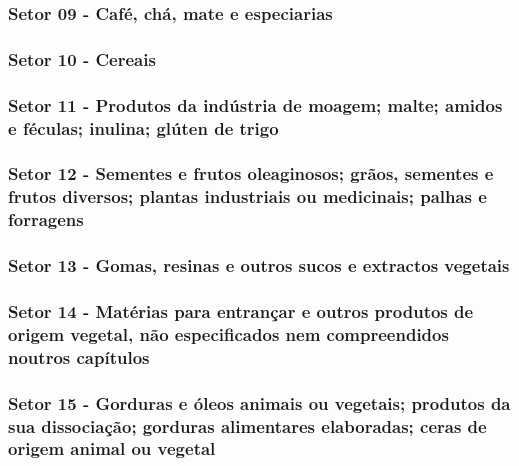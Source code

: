  
\subsubsection{Setor 09 - Café, chá, mate e especiarias}

 

\newpage

\subsubsection{Setor 10 - Cereais}



\newpage

\subsubsection{Setor 11 - Produtos da indústria de moagem; malte; amidos e féculas; inulina; glúten de trigo}



\newpage

\subsubsection{Setor 12 - Sementes e frutos oleaginosos; grãos, sementes e frutos diversos; plantas industriais ou medicinais; palhas e forragens}



\newpage

\subsubsection{Setor 13 - Gomas, resinas e outros sucos e extractos vegetais}



\subsubsection{Setor 14 - Matérias para entrançar e outros produtos de origem vegetal, não especificados nem compreendidos noutros capítulos}



\newpage

\subsubsection{Setor 15 - Gorduras e óleos animais ou vegetais; produtos da sua dissociação; gorduras alimentares elaboradas; ceras de origem animal ou vegetal}

 

